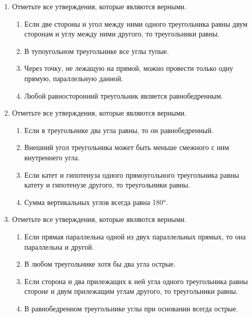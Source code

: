 \documentclass[a4paper,12pt]{article}
\newcommand{\taskspace}{\par\vspace{0.42cm}}
\begin{document}
\begin{enumerate}[resume]
\taskspace

\item Отметьте все утверждения, которые являются верными.
\begin{enumerate}[label=\arabic*),leftmargin=8mm,itemsep=0.25em,topsep=0.35em]
\item Если две стороны и угол между ними одного треугольника равны двум сторонам и углу между ними другого, то треугольники равны.
\item В тупоугольном треугольнике все углы тупые.
\item Через точку, не лежащую на прямой, можно провести только одну прямую, параллельную данной.
\item Любой равносторонний треугольник является равнобедренным.
\end{enumerate}

\taskspace

\item Отметьте все утверждения, которые являются верными.
\begin{enumerate}[label=\arabic*),leftmargin=8mm,itemsep=0.25em,topsep=0.35em]
\item Если в треугольнике два угла равны, то он равнобедренный.
\item Внешний угол треугольника может быть меньше смежного с ним внутреннего угла.
\item Если катет и гипотенуза одного прямоугольного треугольника равны катету и гипотенузе другого, то треугольники равны.
\item Сумма вертикальных углов всегда равна 180°.
\end{enumerate}

\taskspace

\item Отметьте все утверждения, которые являются верными.
\begin{enumerate}[label=\arabic*),leftmargin=8mm,itemsep=0.25em,topsep=0.35em]
\item Если прямая параллельна одной из двух параллельных прямых, то она параллельна и другой.
\item В любом треугольнике хотя бы два угла острые.
\item Если сторона и два прилежащих к ней угла одного треугольника равны стороне и двум прилежащим углам другого, то треугольники равны.
\item В равнобедренном треугольнике углы при основании всегда острые.
\end{enumerate}

\taskspace

\end{enumerate}
\end{document}
